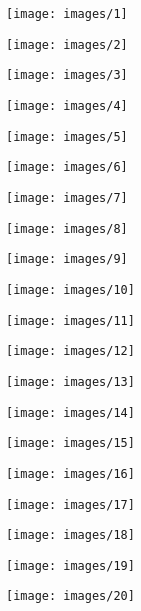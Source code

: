 \documentclass[12pt, a4paper]{article}
\begin{document}
\begin{figure}[H]
	\texttt{[image: images/1]}
\end{figure}
\begin{figure}[H]
	\texttt{[image: images/2]}
\end{figure}
\begin{figure}[H]
	\texttt{[image: images/3]}
\end{figure}
\begin{figure}[H]
	\texttt{[image: images/4]}
\end{figure}
\begin{figure}[H]
	\texttt{[image: images/5]}
\end{figure}
\begin{figure}[H]
	\texttt{[image: images/6]}
\end{figure}
\begin{figure}[H]
	\texttt{[image: images/7]}
\end{figure}
\begin{figure}[H]
	\texttt{[image: images/8]}
\end{figure}
\begin{figure}[H]
	\texttt{[image: images/9]}
\end{figure}
\begin{figure}[H]
	\texttt{[image: images/10]}
\end{figure}
\begin{figure}[H]
	\texttt{[image: images/11]}
\end{figure}
\begin{figure}[H]
	\texttt{[image: images/12]}
\end{figure}
\begin{figure}[H]
	\texttt{[image: images/13]}
\end{figure}
\begin{figure}[H]
	\texttt{[image: images/14]}
\end{figure}
\begin{figure}[H]
	\texttt{[image: images/15]}
\end{figure}
\begin{figure}[H]
	\texttt{[image: images/16]}
\end{figure}
\begin{figure}[H]
	\texttt{[image: images/17]}
\end{figure}
\begin{figure}[H]
	\texttt{[image: images/18]}
\end{figure}
\begin{figure}[H]
	\texttt{[image: images/19]}
\end{figure}
\begin{figure}[H]
	\texttt{[image: images/20]}
\end{figure}
\end{document}
